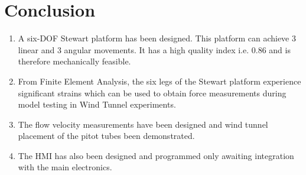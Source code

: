 \chapter{Conclusion}
\begin{enumerate}
\item A six-DOF Stewart platform has been designed. This platform can achieve 3 linear and 3 angular movements. It has a high quality index i.e. 0.86 and is therefore mechanically feasible.
\item From Finite Element Analysis, the six legs of the Stewart platform experience significant strains which can be used to obtain force measurements during model testing in Wind Tunnel experiments.
\item The flow velocity measurements have been designed and wind tunnel placement of the pitot tubes been demonstrated.
\item The HMI has also been designed and programmed only awaiting integration with the main electronics.
\end{enumerate}


